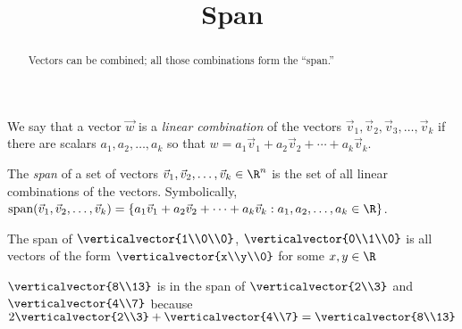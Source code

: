 \documentclass{ximera}
\title{Span}
\begin{document}
\begin{abstract}
  Vectors can be combined; all those combinations form the ``span.''
\end{abstract}
\maketitle

\begin{definition}
  We say that a vector $\vec{w}$ is a \textit{linear combination} of the
  vectors $\vec{v}_1,\vec{v}_2,\vec{v}_3,\dots,\vec{v}_k$ if there are scalars
  $a_1,a_2,\dots,a_k$ so that $w = a_1\vec{v}_1+a_2\vec{v}_2+\cdots+a_k\vec{v}_k$.
\end{definition}
  		
\begin{definition}
  The \textit{span} of a set of vectors $\vec{v}_1,\vec{v}_2,\dots,\vec{v}_k \in \R^n$ is the set of all linear combinations of the vectors.
  Symbolically, $\text{span}(\vec{v}_1,\vec{v}_2,\dots,\vec{v}_k) = \{ a_1\vec{v}_1+a_2\vec{v}_2+\cdots+a_k\vec{v}_k : a_1,a_2,\dots,a_k \in \R\}$.
\end{definition}

\begin{example}
  The span of $\verticalvector{1\\0\\0}$, $\verticalvector{0\\1\\0}$ is all vectors of the form $\verticalvector{x\\y\\0}$ for some $x,y \in \R$
\end{example}

\begin{example}
  $\verticalvector{8\\13}$ is in the span of $\verticalvector{2\\3}$ and $\verticalvector{4\\7}$ because
  $2\verticalvector{2\\3} + \verticalvector{4\\7} = \verticalvector{8\\13}$ 
\end{example}
\end{document}
